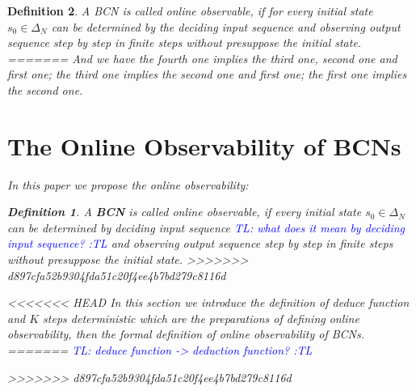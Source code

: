 \documentclass[conference]{IEEEtran} %
\newtheorem{definition}{Definition}
\newcommand{\tl}[1]{\textcolor{blue} {TL: #1 :TL} }
\begin{document}
\begin{definition}
	A {\em BCN} is called online observable, if for every initial state $s_0 \in \Delta_N$ can be determined by the deciding input sequence and observing output sequence step by step in finite steps without presuppose the  initial state.
=======
And we have the fourth one implies the third one, second one and first one; the third one implies the second one and first one; the first one implies the second one. 

\section{The Online Observability of BCNs}
In this paper we propose the online observability: 

\begin{definition}
	A {\bf BCN} is called online observable, if every initial state $s_0 \in \Delta_N$ can be determined by   deciding input sequence \tl{what does it mean by deciding input sequence?} and observing output sequence step by step in finite steps without presuppose the  initial state.
>>>>>>> d897cfa52b9304fda51c20f4ee4b7bd279c8116d
\end{definition}


<<<<<<< HEAD
In this section we introduce the definition of deduce function and $K$ steps deterministic which are the preparations of defining online observability, then the formal definition of online observability of {\em BCNs}. 
=======
\tl{deduce function -> deduction function?} 

>>>>>>> d897cfa52b9304fda51c20f4ee4b7bd279c8116d

\end{definition}
\end{document}
